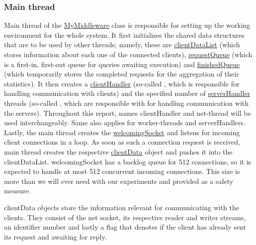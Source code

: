 \documentclass[11pt,a4paper]{article}
\begin{document}
\subsubsection{Main thread} \label{sec:overview-mainthread}
Main thread of the \underline{MyMiddleware} class is responsible for setting up the working environment for the whole system. It first initializes the shared data structures that are to be used by other threads; namely, these are \underline{clientDataList} (which stores information about each one of the connected clients), \underline{requestQueue} (which is a first-in, first-out queue for queries awaiting execution) and \underline{finishedQueue} (which temporarily stores the completed requests for the aggregation of their statistics). It then creates a \underline{clientHandler} (so-called , which is responsible for handling communication with clients) and the specified number of \underline{serverHandler} threads (so-called , which are responsible with for handling communication with the servers). Throughout this report, names clientHandler and net-thread will be used interchangeably. Same also applies for worker-threads and serverHandlers. Lastly, the main thread creates the \underline{welcomingSocket} and listens for incoming client connections in a loop. As soon as such a connection request is received, main thread creates the respective \underline{clientData} object and pushes it into the clientDataList. welcomingSocket has a backlog queue for 512 connections, so it is expected to handle at most 512 concurrent incoming connections. This size is more than we will ever need with our experiments and provided as a safety measure.
\par
clientData objects store the information relevant for communicating with the clients. They consist of the net socket, its respective reader and writer streams, an identifier number and lastly a flag that denotes if the client has already sent its request and awaiting for reply.
\end{document}
